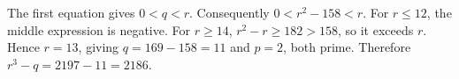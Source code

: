 The first equation gives $0<q<r$. Consequently $0<r^2-158<r$. For $r\le12$, the middle expression is negative. For $r\ge14$, $r^2-r\ge182>158$, so it exceeds $r$. Hence $r=13$, giving $q=169-158=11$ and $p=2$, both prime. Therefore $r^3-q=2197-11=\boxed{2186}$.
